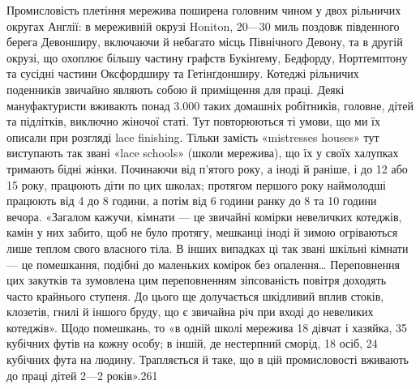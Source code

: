 Промисловість плетіння мережива поширена головним чином
у двох рільничих округах Англії: в мереживній окрузі Honiton,
20—30 миль поздовж південного берега Девонширу, включаючи
й небагато місць Північного Девону, та в другій окрузі, що
охоплює більшу частину графств Букінґему, Бедфорду, Нортґемптону
та сусідні частини Оксфордширу та Гетінґдонширу.
Котеджі рільничих поденників звичайно являють собою й приміщення
для праці. Деякі мануфактуристи вживають понад
3.000 таких домашніх робітників, головне, дітей та підлітків,
виключно жіночої статі. Тут повторюються ті умови, що ми їх
описали при розгляді lace finishing. Тільки замість «mistresses
houses» тут виступають так звані «lace schools» (школи мережива),
що їх у своїх халупках тримають бідні жінки. Починаючи від
п’ятого року, а іноді й раніше, і до 12 або 15 року, працюють
діти по цих школах; протягом першого року наймолодші працюють
від 4 до 8 години, а потім від 6 години ранку до 8 та 10 години
вечора. «Загалом кажучи, кімнати — це звичайні комірки невеличких
котеджів, камін у них забито, щоб не було протягу, мешканці
іноді й зимою огріваються лише теплом свого власного
тіла. В інших випадках ці так звані шкільні кімнати — це помешкання,
подібні до маленьких комірок без опалення\dots{} Переповнення
цих закутків та зумовлена цим переповненням зіпсованість
повітря доходять часто крайнього ступеня. До цього ще
долучається шкідливий вплив стоків, клозетів, гнилі й іншого
бруду, що є звичайна річ при вході до невеликих котеджів». Щодо
помешкань, то «в одній школі мережива 18 дівчат і хазяйка,
35 кубічних футів на кожну особу; в іншій, де нестерпний сморід,
18 осіб, 24 кубічних фута на людину. Трапляється й таке, що
в цій промисловості вживають до праці дітей 2—2 років».261

